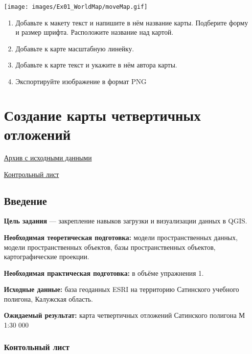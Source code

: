 \documentclass[
  12pt,
]{book}
\begin{document}
\texttt{[image: images/Ex01\_WorldMap/moveMap.gif]}

\begin{enumerate}
\def\labelenumi{\arabic{enumi}.}
\setcounter{enumi}{9}
\item
  Добавьте к макету текст и напишите в нём название карты. Подберите форму и размер шрифта. Расположите название над картой.
\item
  Добавьте к карте масштабную линейку.
\item
  Добавьте к карте текст и укажите в нём автора карты.
\item
  Экспортируйте изображение в формат PNG
\end{enumerate}

\hypertarget{map-design-quaternary}{%
\chapter{Создание карты четвертичных отложений}\label{map-design-quaternary}}

\href{https://github.com/aentin/qgis-course/raw/master/files/Ex03.zip}{Архив с исходными данными}

\href{https://github.com/aentin/qgis-course/raw/master/files/Ex03_\%D0\%BE\%D1\%82\%D1\%87\%D1\%91\%D1\%82.docx}{Контрольный лист}

\hypertarget{map-design-quaternary-intro}{%
\section{Введение}\label{map-design-quaternary-intro}}

\textbf{Цель задания} --- закрепление навыков загрузки и визуализации данных в QGIS.

\textbf{Необходимая теоретическая подготовка:} модели пространственных данных, модели пространственных объектов, базы пространственных объектов, картографические проекции.

\textbf{Необходимая практическая подготовка:} в объёме упражнения 1.

\textbf{Исходные данные:} база геоданных ESRI на территорию Сатинского учебного полигона, Калужская область.

\textbf{Ожидаемый результат:} карта четвертичных отложений Сатинского полигона М 1:30 000

\hypertarget{map-design-quaternary-checklist}{%
\subsection{Контольный лист}\label{map-design-quaternary-checklist}}
\end{document}
